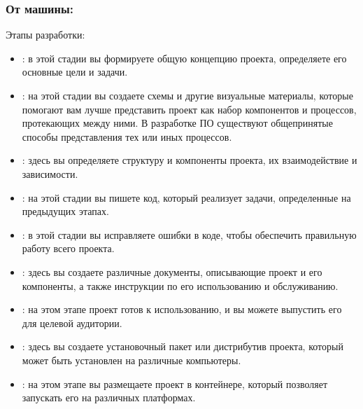 \documentclass[letterpaper,10pt,russian]{sphinxmanual}
\begin{document}
\subsubsection{От машины:}
\label{\detokenize{educational_materials/stages/content:id4}}
\sphinxAtStartPar
Этапы разработки:
\begin{itemize}
\item {} 
\sphinxAtStartPar
{}: в этой стадии вы формируете общую концепцию проекта, определяете его основные цели и задачи.

\item {} 
\sphinxAtStartPar
{}: на этой стадии вы создаете схемы и другие визуальные материалы, которые помогают вам лучше представить проект как набор компонентов и процессов, протекающих между ними. В разработке ПО существуют общепринятые способы представления тех или иных процессов.

\item {} 
\sphinxAtStartPar
{}: здесь вы определяете структуру и компоненты проекта, их взаимодействие и зависимости.

\item {} 
\sphinxAtStartPar
{}: на этой стадии вы пишете код, который реализует задачи, определенные на предыдущих этапах.

\item {} 
\sphinxAtStartPar
{}: в этой стадии вы исправляете ошибки в коде, чтобы обеспечить правильную работу всего проекта.

\item {} 
\sphinxAtStartPar
{}: здесь вы создаете различные документы, описывающие проект и его компоненты, а также инструкции по его использованию и обслуживанию.

\item {} 
\sphinxAtStartPar
{}: на этом этапе проект готов к использованию, и вы можете выпустить его для целевой аудитории.

\item {} 
\sphinxAtStartPar
{}: здесь вы создаете установочный пакет или дистрибутив проекта, который может быть установлен на различные компьютеры.

\item {} 
\sphinxAtStartPar
{}: на этом этапе вы размещаете проект в контейнере, который позволяет запускать его на различных платформах.

\end{itemize}
\end{document}

